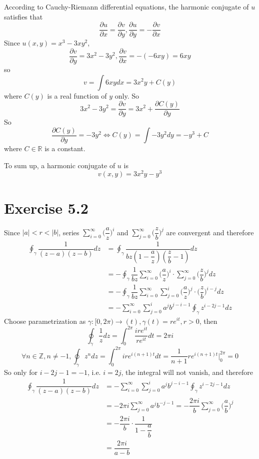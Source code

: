\documentclass[a4paper,12pt,titlepage]{article}
\begin{document}
According to Cauchy-Riemann differential equations, the harmonic conjugate of $u$ satisfies that 
$$\dfrac{\partial u}{\partial x}=\dfrac{\partial v}{\partial y},\dfrac{\partial u}{\partial y}=-\dfrac{\partial v}{\partial x}$$
Since $u(x,y)=x^3-3xy^2$, 
$$\dfrac{\partial v}{\partial y}=3x^2-3y^2,\dfrac{\partial v}{\partial x}=-(-6xy)=6xy$$
so
$$v=\int6xydx=3x^2y+C(y)$$
where $C(y)$ is a real function of $y$ only. So
$$3x^2-3y^2=\dfrac{\partial v}{\partial y}=3x^2+\dfrac{\partial C(y)}{\partial y}$$
So 
$$\dfrac{\partial C(y)}{\partial y}=-3y^2\Leftrightarrow C(y)=\int -3y^2dy=-y^3+C$$
where $C\in\mathbb{R}$ is a constant.

To sum up, a harmonic conjugate of $u$ is
$$v(x,y)=3x^2y-y^3$$


\section*{Exercise 5.2}
Since $|a|<r<|b|$, series $\sum\limits_{i=0}^{\infty}\Big(\dfrac{a}{z}\Big)^i$ and $\sum\limits_{j=0}^{\infty}\Big(\dfrac{z}{b}\Big)^j$ are convergent and therefore
\begin{align*}
\oint_{\gamma}\dfrac{1}{(z-a)(z-b)}dz&=\oint_{\gamma}\dfrac{1}{bz(1-\dfrac{a}{z})(\dfrac{z}{b}-1)}dz\\
&=-\oint_{\gamma}\dfrac{1}{bz}\sum\limits_{i=0}^{\infty}\Big(\dfrac{a}{z}\Big)^i\cdot \sum\limits_{j=0}^{\infty}\Big(\dfrac{z}{b}\Big)^j dz\\
&=-\oint_{\gamma}\dfrac{1}{bz}\sum\limits_{i=0}^{\infty} \sum\limits_{j=0}^{i}\Big(\dfrac{a}{z}\Big)^j\cdot\Big(\dfrac{z}{b}\Big)^{i-j} dz\\
&=-\sum\limits_{i=0}^{\infty} \sum\limits_{j=0}^{i}a^jb^{j-i-1}\oint_{\gamma}z^{i-2j-1} dz
\end{align*}
Choose parametrization as $\gamma:[0,2\pi)\rightarrow(t),\gamma(t)=re^{it},r>0$, then
 $$\oint_{\gamma}\dfrac{1}{z}dz=\int_0^{2\pi}\dfrac{ire^{it}}{re^{it}}dt=2\pi i$$
$$\forall n\in\mathbb{Z},n\neq -1, \oint_{\gamma}z^n dz=\int_0^{2\pi}ire^{i(n+1)t}dt=\dfrac{1}{n+1}re^{i(n+1)t}|_0^{2\pi}=0$$
So only for $i-2j-1=-1$, i.e. $i=2j$, the integral will not vanish, and therefore
\begin{align*}
\oint_{\gamma}\dfrac{1}{(z-a)(z-b)}dz&=-\sum\limits_{i=0}^{\infty} \sum\limits_{j=0}^{i}a^jb^{j-i-1}\oint_{\gamma}z^{i-2j-1} dz\\
&=-2\pi i\sum\limits_{j=0}^{\infty}a^jb^{-j-1}=-\dfrac{2\pi i}{b}\sum\limits_{j=0}^{\infty}\Big(\dfrac{a}{b}\Big)^j\\
&=-\dfrac{2\pi i}{b}\cdot\dfrac{1}{1-\dfrac{a}{b}}\\
&=\dfrac{2\pi i}{a-b}
\end{align*}
\end{document}
